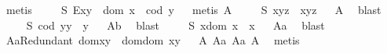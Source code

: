 \begin{isabellebody}
\ metis%
\endisatagproof
{\isafoldproof}%
%
\isadelimproof
%
\endisadelimproof
\isanewline
\ \ \ \isamarkupfalse%
\ S{}{\isacharcolon}\ {\isachardoublequoteopen}E{\isacharparenleft}x{\isasymcdot}y{\isacharparenright}\ \isactrlbold {\isasymleftrightarrow}\ dom\ x\ {\isasymsimeq}\ cod\ y{\isachardoublequoteclose}%
\isadelimproof
\ %
\endisadelimproof
%
\isatagproof
{}\isamarkupfalse%
\ {\isacharparenleft}metis\ A{}{\isacharparenright}%
\endisatagproof
{\isafoldproof}%
%
\isadelimproof
%
\endisadelimproof
\isanewline
\ \ \ \isamarkupfalse%
\ S{}{\isacharcolon}\ {\isachardoublequoteopen}x{\isasymcdot}{\isacharparenleft}y{\isasymcdot}z{\isacharparenright}\ {\isasymcong}\ {\isacharparenleft}x{\isasymcdot}y{\isacharparenright}{\isasymcdot}z{\isachardoublequoteclose}%
\isadelimproof
\ %
\endisadelimproof
%
\isatagproof
{}\isamarkupfalse%
\ A{}\ \isamarkupfalse%
\ blast%
\endisatagproof
{\isafoldproof}%
%
\isadelimproof
%
\endisadelimproof
\isanewline
\ \ \ \isamarkupfalse%
\ S{}{\isacharcolon}\ {\isachardoublequoteopen}{\isacharparenleft}cod\ y{\isacharparenright}{\isasymcdot}y\ {\isasymcong}\ y{\isachardoublequoteclose}%
\isadelimproof
\ %
\endisadelimproof
%
\isatagproof
{}\isamarkupfalse%
\ A{}b\ \isamarkupfalse%
\ blast%
\endisatagproof
{\isafoldproof}%
%
\isadelimproof
%
\endisadelimproof
\isanewline
\ \ \ \isamarkupfalse%
\ S{}{\isacharcolon}\ {\isachardoublequoteopen}x{\isasymcdot}{\isacharparenleft}dom\ x{\isacharparenright}\ {\isasymcong}\ x{\isachardoublequoteclose}%
\isadelimproof
\ %
\endisadelimproof
%
\isatagproof
{}\isamarkupfalse%
\ A{}a\ \isamarkupfalse%
\ blast%
\endisatagproof
{\isafoldproof}%
%
\isadelimproof
%
\endisadelimproof
\isanewline
\isanewline
\ \ \ \isamarkupfalse%
\ A{}aRedundant{\isacharcolon}\ {\isachardoublequoteopen}dom{\isacharparenleft}x{\isasymcdot}y{\isacharparenright}\ {\isasymcong}\ dom{\isacharparenleft}{\isacharparenleft}dom\ x{\isacharparenright}{\isasymcdot}y{\isacharparenright}{\isachardoublequoteclose}%
\isadelimproof
\ %
\endisadelimproof
%
\isatagproof
{}\isamarkupfalse%
\ A{}\ A{}a\ A{}a\ A{}\ \isamarkupfalse%
\ metis%
\endisatagproof
{\isafoldproof}%
%
\isadelimproof
%
\endisadelimproof
\isanewline
\ \ \ \isamarkupfalse%

\end{isabellebody}
